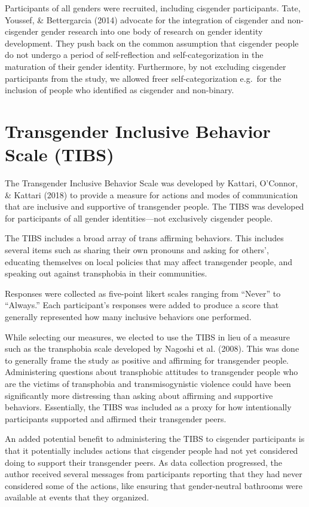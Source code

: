 \documentclass[12pt,twoside]{reedthesis}
\begin{document}
Participants of all genders were recruited, including cisgender participants. Tate, Youssef, \& Bettergarcia (2014) advocate for the integration of cisgender and non-cisgender gender research into one body of research on gender identity development. They push back on the common assumption that cisgender people do not undergo a period of self-reflection and self-categorization in the maturation of their gender identity. Furthermore, by not excluding cisgender participants from the study, we allowed freer self-categorization e.g.~for the inclusion of people who identified as cisgender and non-binary.

\hypertarget{transgender-inclusive-behavior-scale-tibs}{%
\section{Transgender Inclusive Behavior Scale (TIBS)}\label{transgender-inclusive-behavior-scale-tibs}}

The Transgender Inclusive Behavior Scale was developed by Kattari, O'Connor, \& Kattari (2018) to provide a measure for actions and modes of communication that are inclusive and supportive of transgender people. The TIBS was developed for participants of all gender identities---not exclusively cisgender people.

The TIBS includes a broad array of trans affirming behaviors. This includes several items such as sharing their own pronouns and asking for others', educating themselves on local policies that may affect transgender people, and speaking out against transphobia in their communities.

Responses were collected as five-point likert scales ranging from ``Never'' to ``Always.'' Each participant's responses were added to produce a score that generally represented how many inclusive behaviors one performed.

While selecting our measures, we elected to use the TIBS in lieu of a measure such as the transphobia scale developed by Nagoshi et al. (2008). This was done to generally frame the study as positive and affirming for transgender people. Administering questions about transphobic attitudes to transgender people who are the victims of transphobia and transmisogynistic violence could have been significantly more distressing than asking about affirming and supportive behaviors. Essentially, the TIBS was included as a proxy for how intentionally participants supported and affirmed their transgender peers.

An added potential benefit to administering the TIBS to cisgender participants is that it potentially includes actions that cisgender people had not yet considered doing to support their transgender peers. As data collection progressed, the author received several messages from participants reporting that they had never considered some of the actions, like ensuring that gender-neutral bathrooms were available at events that they organized.
\end{document}

